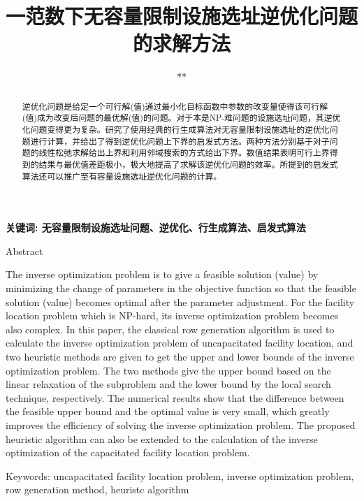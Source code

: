\documentclass[UTF8]{article}
\author {**}
\title {一范数下无容量限制设施选址逆优化问题的求解方法}
\date{}
\begin{document}
    \maketitle

\begin{abstract}
逆优化问题是给定一个可行解(值)通过最小化目标函数中参数的改变量使得该可行解(值)成为改变后问题的最优解(值)的问题。对于本是NP-难问题的设施选址问题，其逆优化问题变得更为复杂。研究了使用经典的行生成算法对无容量限制设施选址的逆优化问题进行计算，并给出了得到逆优化问题上下界的启发式方法。两种方法分别基于对子问题的线性松弛求解给出上界和利用邻域搜索的方式给出下界。数值结果表明可行上界得到的结果与最优值差距极小，极大地提高了求解该逆优化问题的效率。所提到的启发式算法还可以推广至有容量设施选址逆优化问题的计算。

\end{abstract}

\qquad \textbf{关键词: 无容量限制设施选址问题、逆优化、行生成算法、启发式算法}

Abstract

The inverse optimization problem is to give a feasible solution (value) by minimizing the change of parameters in the objective function so that the feasible solution (value) becomes optimal after the parameter adjustment. For the facility location problem which is NP-hard, its inverse optimization problem becomes also complex. In this paper, the classical row generation algorithm is used to calculate the inverse optimization problem of uncapacitated facility location, and two heuristic methods are given to get the upper and lower bounds of the inverse optimization problem. The two methods give the upper bound based on the linear relaxation of the subproblem and the lower bound by the local search technique, respectively. The numerical results show that the difference between the feasible upper bound and the optimal value is very small, which greatly improves the efficiency of solving the inverse optimization problem. The proposed heuristic algorithm can also be extended to the calculation of the inverse optimization of the capacitated facility location problem.

Keywords: uncapacitated facility location problem, inverse optimization problem, row generation method, heuristc algorithm
\end{document}
